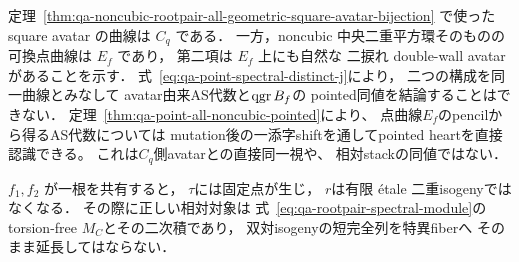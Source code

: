 \begin{remark}
\label{rem:qa-point-spectral-pointed-warning}
定理~\ref{thm:qa-noncubic-rootpair-all-geometric-square-avatar-bijection}
で使った square avatar の曲線は \emph{$C_q$} である．
一方，noncubic 中央二重平方環そのものの
可換点曲線は \emph{$E_f$} であり，
第二項は $E_f$ 上にも自然な
二捩れ double-wall avatar があることを示す．
式~\eqref{eq:qa-point-spectral-distinct-j}により，
二つの構成を同一曲線とみなして
avatar由来AS代数と$\operatorname{qgr} B_f$の
pointed同値を結論することはできない．
定理~\ref{thm:qa-point-all-noncubic-pointed}により、
点曲線$E_f$のpencilから得るAS代数については
mutation後の一添字shiftを通してpointed heartを直接認識できる。
これは$C_q$側avatarとの直接同一視や、
相対stackの同値ではない．

$f_1,f_2$ が一根を共有すると，
$\tau$には固定点が生じ，
$r$は有限 \'{e}tale 二重isogenyではなくなる．
その際に正しい相対対象は
式~\eqref{eq:qa-rootpair-spectral-module}の
torsion-free $M_C$とその二次積であり，
双対isogenyの短完全列を特異fiberへ
そのまま延長してはならない．
\end{remark}
